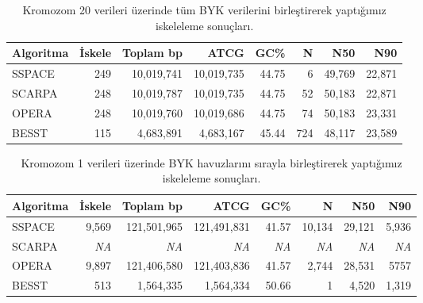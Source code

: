 \documentclass[11pt]{article}
\begin{document}
\begin{table}[htb]
\begin{center}
\begin{tabular}{|l|r|r|r|r|r|r|r}
\hline 
{\bf Algoritma } & {\bf İskele} & {\bf Toplam bp} & {\bf ATCG} & {\bf GC\%} & {\bf N} & {\bf N50} & {\bf N90} \\
\hline
SSPACE & 249	& 10,019,741	& 10,019,735	&  44.75	& 6	& 49,769	& 22,871 \\
SCARPA & 248	& 10,019,787	& 10,019,735	& 44.75	& 52	& 50,183	& 22,871  \\
OPERA  & 248	& 10,019,760	& 10,019,686	& 44.75	& 74	& 50,183	& 23,331 \\
BESST  & 115	& 4,683,891	& 4,683,167	& 45.44	& 724	 & 48,117  	& 23,589 \\
\hline
\end{tabular}
\end{center}
\caption{Kromozom 20 verileri üzerinde tüm BYK verilerini birleştirerek yaptığımız iskeleleme sonuçları.}
\label{tab:chr20w}
\end{table}


\begin{table}[htb]
\begin{center}
\begin{tabular}{|l|r|r|r|r|r|r|r}
\hline 
{\bf Algoritma } & {\bf İskele} & {\bf Toplam bp} & {\bf ATCG} & {\bf GC\%} & {\bf N} & {\bf N50} & {\bf N90} \\
\hline
SSPACE & 9,569       & 121,501,965        & 121,491,831 & 41.57 & 10,134 & 29,121 & 5,936 \\
SCARPA &  \textit{NA}  &  \textit{NA}     &     \textit{NA}  &   \textit{NA}   &  \textit{NA}    &  \textit{NA}    &  \textit{NA}   \\
OPERA  & 9,897       & 121,406,580        & 121,403,836 & 41.57 & 2,744  & 28,531 & 5757 \\
BESST  & 513 & 1,564,335          & 1,564,334   & 50.66 & 1     & 4,520  & 1,319 \\ 
\hline
\end{tabular}
\end{center}
\caption{Kromozom 1 verileri üzerinde BYK havuzlarını sırayla birleştirerek yaptığımız iskeleleme sonuçları.}
\label{tab:chr1h}
\end{table}
\end{document}
